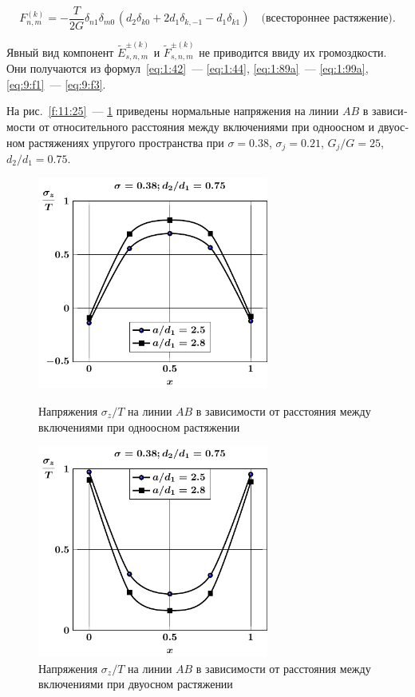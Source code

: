 \begin{russian}
\begin{equation*}
F_{n,m}^{(k)} =  -\frac{T}{2G}{\delta _{n1}}{\delta _{m0\,}}(d_2\delta_{k0}+2d_1{\delta _{k, - 1}} - d_1{\delta _{k1}})\quad\text{(всестороннее растяжение)}.
\end{equation*}

Явный вид компонент $\tilde E_{s,n,m}^{\pm(k)}$ и $\tilde F_{s,n,m}^{\pm(k)}$ не приводится ввиду их громоздкости. Они получаются из формул~\eqref{eq:1:42}~--- \eqref{eq:1:44}, \eqref{eq:1:89a}~--- \eqref{eq:1:99a}, \eqref{eq:9:f1}~--- \eqref{eq:9:f3}.

На рис.~\ref{f:11:25}~--- \ref{f:11:30} приведены нормальные напряжения на линии $AB$ в зависимости от относительного расстояния между включениями при одноосном и двуосном растяжениях упругого пространства при $\sigma=0.38$, $\sigma_j=0.21$, $G_j/G=25$, $d_2/d_1=0.75$.

\begin{figure}[h!]
\centering\footnotesize
\parbox[b]{7.5cm}{\centering\includegraphics[width=7.6cm]{periodic-inc27-a-d75-g25-t1-sig_z.pdf}
\caption{Напряжения $\sigma_z/T$ на линии $AB$ в зависимости от расстояния между включениями при одноосном растяжении
\label{f:11:29}}}\hfil\hfil
\parbox[b]{7.5cm}{\centering\includegraphics[width=7.6cm]{periodic-inc27-a-d75-g25-t2-sig_z.pdf}
\caption{Напряжения $\sigma_z/T$ на линии $AB$ в зависимости от расстояния между включениями при двуосном растяжении
\label{f:11:30}}}
\end{figure}


\end{russian}
